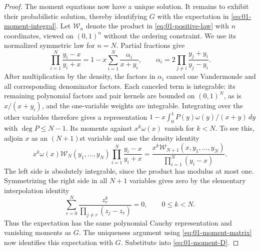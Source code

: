 \begin{proof}
The moment equations now have a unique solution. It remains to
exhibit their probabilistic solution, thereby identifying $G$ with the
expectation in \eqref{eq:01-moment-integral}. Let $\mathcal W_n$ denote
the product in \eqref{eq:01-positive-law} with $n$ coordinates, viewed
on $(0,1)^n$ without the ordering constraint. We use its normalized
symmetric law for $n=N$. Partial fractions give
\[
 \prod_{i=1}^N\frac{y_i-x}{y_i+x}
 =1-x\sum_{i=1}^N\frac{\alpha_i}{x+y_i},
 \qquad
 \alpha_i=2\prod_{j\ne i}\frac{y_j+y_i}{y_j-y_i}.
\]
After multiplication by the density, the factors in $\alpha_i$
cancel one Vandermonde and all corresponding denominator factors.
Each canceled term is integrable: its remaining polynomial factors
and pair kernels are bounded on $(0,1)^N$, as is $x/(x+y_i)$, and
the one-variable weights are integrable.
Integrating over the other variables therefore gives a representation
$1-x\int_0^1P(y)\omega(y)/(x+y)\,dy$ with $\deg P\le N-1$.
Its moments against $x^k\omega(x)$ vanish for $k<N$. To see this,
adjoin $x$ as an $(N+1)$st variable and use the density identity
\[
 x^k\omega(x)\mathcal W_N(y_1,\ldots,y_N)
       \prod_{i=1}^N\frac{y_i-x}{y_i+x}
 =\frac{x^k\mathcal W_{N+1}(x,y_1,\ldots,y_N)}
          {\prod_{i=1}^N(y_i-x)}.
\]
The left side is absolutely integrable, since the product has modulus
at most one. Symmetrizing the right side in all $N+1$ variables gives
zero by the elementary interpolation identity
\[
 \sum_{r=0}^N\frac{z_r^k}{\prod_{j\ne r}(z_j-z_r)}=0,
 \qquad 0\le k<N.
\]
Thus the expectation has the same polynomial Cauchy representation
and vanishing moments as $G$. The uniqueness argument using
\eqref{eq:01-moment-matrix} now identifies this expectation with $G$.
Substitute into \eqref{eq:01-moment-D}.
\end{proof}
